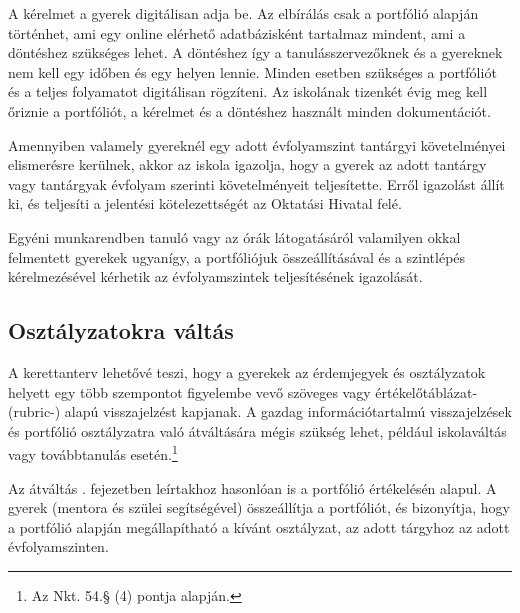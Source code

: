 A kérelmet a gyerek digitálisan adja be. Az elbírálás csak a portfólió alapján történhet, ami egy online elérhető adatbázisként tartalmaz mindent, ami a döntéshez szükséges lehet. A döntéshez így a tanulásszervezőknek és a gyereknek nem kell egy időben és egy helyen lennie. Minden esetben szükséges a portfóliót és a teljes folyamatot digitálisan rögzíteni. Az iskolának tizenkét évig meg kell őriznie a portfóliót, a kérelmet és a döntéshez használt minden dokumentációt.

Amennyiben valamely gyereknél egy adott évfolyamszint tantárgyi követelményei elismerésre kerülnek, akkor az iskola igazolja, hogy a gyerek az adott tantárgy vagy tantárgyak évfolyam szerinti követelményeit teljesítette. Erről igazolást állít ki, és teljesíti a jelentési kötelezettségét az Oktatási Hivatal felé.

Egyéni munkarendben tanuló vagy az órák látogatásáról valamilyen okkal felmentett gyerekek ugyanígy, a portfóliójuk összeállításával és a szintlépés kérelmezésével kérhetik az évfolyamszintek teljesítésének igazolását.

\subsection{Osztályzatokra váltás}
\label{sec:osztalyzatok}
A kerettanterv lehetővé teszi, hogy a gyerekek az érdemjegyek és osztályzatok helyett egy több szempontot figyelembe vevő szöveges vagy értékelőtáblázat- (rubric-) alapú visszajelzést kapjanak. A gazdag információtartalmú visszajelzések és portfólió osztályzatra való átváltására mégis szükség lehet, például iskolaváltás vagy továbbtanulás esetén.\footnote{Az Nkt. 54.§ (4) pontja alapján.}

Az átváltás . fejezetben leírtakhoz hasonlóan is a portfólió értékelésén alapul. A gyerek (mentora és szülei segítségével) összeállítja a portfóliót, és bizonyítja, hogy a portfólió alapján megállapítható a kívánt osztályzat, az adott tárgyhoz az adott évfolyamszinten.
